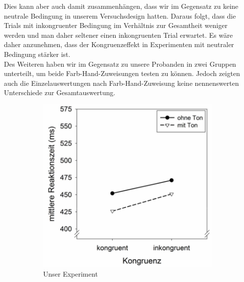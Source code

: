 Dies kann aber auch damit zusammenhängen, dass wir im Gegensatz zu \textcite{weinbach2012relationship} keine neutrale Bedingung in unserem Versuchsdesign hatten. Daraus folgt, dass die Trials mit inkongruenter Bedingung im Verhältnis zur Gesamtheit weniger werden und man daher seltener einen inkongruenten Trial erwartet. Es wäre daher anzunehmen, dass der Kongruenzeffekt in Experimenten mit neutraler Bedingung stärker ist.\\
Des Weiteren haben wir im Gegensatz zu \textcite{weinbach2012relationship} unsere Probanden in zwei Gruppen unterteilt, um beide Farb-Hand-Zuweisungen testen zu können. Jedoch zeigten auch die Einzelauswertungen nach Farb-Hand-Zuweisung keine nennenswerten Unterschiede zur Gesamtauswertung.\\
\begin{figure}[t]
	\centering
		\begin{subfigure}[b]{0.49\textwidth}
	       \includegraphics[width=\textwidth]{grafiken/Vergleich-unser.png}
	       \caption{Unser Experiment}
	       \label{fig:exp1}
	    \end{subfigure}%
	       ~
	    \begin{subfigure}[b]{0.49\textwidth}

\end{subfigure}
\end{figure}
